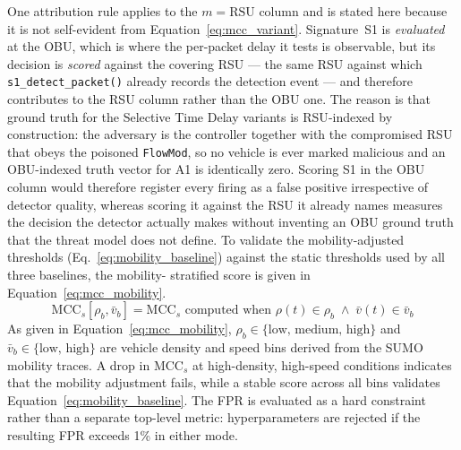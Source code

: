 \documentclass[12pt, a4paper]{report}
\begin{document}
{{One attribution rule applies to the $m{=}\text{RSU}$ column and
is stated here because it is not self-evident from
Equation~\eqref{eq:mcc_variant}. Signature~S1 is
\emph{evaluated} at the \ac{OBU}, which is where the
per-packet delay it tests is observable, but its decision is
\emph{scored} against the covering \ac{RSU} --- the same
\ac{RSU} against which \texttt{s1\_detect\_packet()} already
records the detection event --- and therefore contributes to
the \ac{RSU} column rather than the \ac{OBU} one. The reason
is that ground truth for the Selective Time Delay variants is
\ac{RSU}-indexed by construction: the adversary is the
controller together with the compromised \ac{RSU} that obeys
the poisoned \texttt{FlowMod}, so no vehicle is ever marked
malicious and an \ac{OBU}-indexed truth vector for A1 is
identically zero. Scoring S1 in the \ac{OBU} column would
therefore register every firing as a false positive
irrespective of detector quality, whereas scoring it against
the \ac{RSU} it already names measures the decision the
detector actually makes without inventing an \ac{OBU} ground
truth that the threat model does not define.
To validate the mobility-adjusted thresholds
(Eq.~\ref{eq:mobility_baseline}) against the static
thresholds used by all three baselines, the mobility-
stratified score is given in
Equation~\eqref{eq:mcc_mobility}.
\begin{equation}
\text{MCC}_{s}[\rho_b, \bar{v}_b] =
\text{MCC}_{s}\text{ computed when }
\rho(t) \in \rho_b \;\land\;
\bar{v}(t) \in \bar{v}_b
\label{eq:mcc_mobility}
\end{equation}
As given in Equation~\eqref{eq:mcc_mobility},
$\rho_b \in \{\text{low, medium, high}\}$ and
$\bar{v}_b \in \{\text{low, high}\}$ are vehicle
density and speed bins derived from the SUMO mobility
traces. A drop in $\text{MCC}_{s}$ at high-density,
high-speed conditions indicates that the mobility
adjustment fails, while a stable score across all bins
validates Equation~\eqref{eq:mobility_baseline}.
The \ac{FPR} is evaluated as a hard constraint rather
than a separate top-level metric: hyperparameters are
rejected if the resulting FPR exceeds 1\% in either mode.



}}
\end{document}
